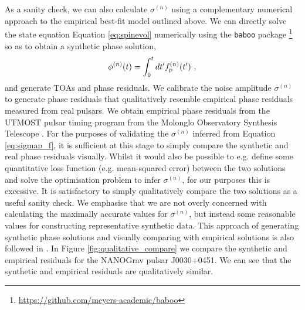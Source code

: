 \documentclass[fleqn,usenatbib,useAMS]{mnras}
\begin{document}
As a sanity check, we can also calculate $\sigma^{(n)}$ using a complementary numerical approach to the empirical best-fit model outlined above. We can directly solve the state equation Equation \eqref{eq:spinevol} numerically using the \texttt{baboo} package \footnote{\url{https://github.com/meyers-academic/baboo}} so as to obtain a synthetic phase solution,
\begin{eqnarray}
	\phi^{(n)}(t) = \int_0^t dt' f^{(n)}_{\rm p}(t') \ ,
\end{eqnarray}
and generate TOAs and phase residuals. We calibrate the noise amplitude $\sigma^{(n)}$  to generate phase residuals that qualitatively resemble empirical phase residuals measured from real pulsars. We obtain empirical phase residuals from the UTMOST pulsar timing program \citep{UTMOST} from the  Molonglo Observatory Synthesis Telescope \citep{Bailes2017PASA...34...45B}. For the purposes of validating the $\sigma^{(n)}$ inferred from Equation \eqref{eq:sigmap_f}, it is sufficient at this stage to simply compare the synthetic and real phase residuals visually. Whilst it would also be possible to e.g. define some quantitative loss function (e.g. mean-squared error) between the two solutions and solve the optimisation problem to infer $\sigma^{(n)}$, for our purposes this is excessive. It is satisfactory to simply qualitatively compare the two solutions as a useful sanity check. We emphasise that we are not overly concerned with calculating the maximally accurate values for $\sigma^{(n)}$, but instead some reasonable values for constructing representative synthetic data. This approach of generating synthetic phase solutions and visually comparing with empirical solutions is also followed in \cite{Vargas}. In Figure \ref{fig:qualitative_compare} we compare the synthetic and empirical residuals for the NANOGrav pulsar J0030+0451. We can see that the synthetic and empirical residuals are qualitatively similar.
\end{document}
